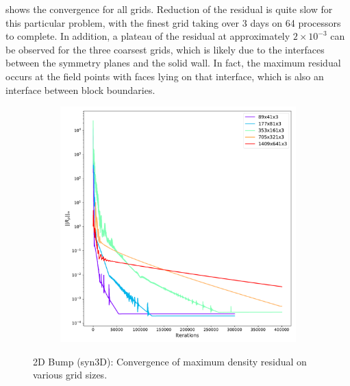  shows the convergence for all grids. Reduction of the residual is quite slow for this particular problem, with the finest grid taking over 3 days on 64 processors to complete. In addition, a plateau of the residual at approximately $2\times10^{-3}$ can be observed for the three coarsest grids, which is likely due to the interfaces between the symmetry planes and the solid wall. In fact, the maximum residual occurs at the field points with faces lying on that interface, which is also an interface between block boundaries.
\begin{figure}[ht!]
\centering
\begin{subfigure}{.45\textwidth}
  \centering
  \includegraphics[width=1.0\textwidth]{figs/2dbump/convergenceRho.pdf}
\end{subfigure}%
\caption{2D Bump (syn3D): Convergence of maximum density residual on various grid sizes.}
\label{fig:syn2dbumpcnvstudy}
\end{figure}

